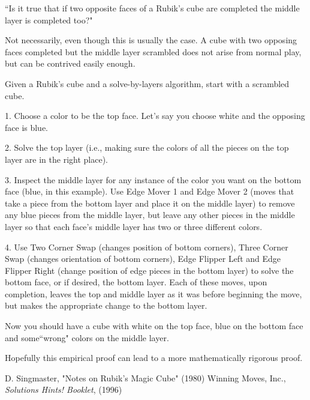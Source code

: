 \documentclass[12pt]{article}
\begin{document}
``Is it true that if two opposite faces of a Rubik's cube are completed the middle layer is completed too?"

Not necessarily, even though this is usually the case. A cube with two opposing faces completed but the middle layer scrambled does not arise from normal play, but can be contrived easily enough.

Given a Rubik's cube and a solve-by-layers algorithm, start with a scrambled cube.

1. Choose a color to be the top face. Let's say you choose white and the opposing face is blue.

2. Solve the top layer (i.e., making sure the colors of all the pieces on the top layer are in the right place).

3. Inspect the middle layer for any instance of the color you want on the bottom face (blue, in this example). Use Edge Mover 1 and Edge Mover 2 (moves that take a piece from the bottom layer and place it on the middle layer) to remove any blue pieces from the middle layer, but leave any other pieces in the middle layer so that each face's middle layer has two or three different colors.

4. Use Two Corner Swap (changes position of bottom corners), Three Corner Swap (changes orientation of bottom corners), Edge Flipper Left and Edge Flipper Right (change position of edge pieces in the bottom layer) to solve the bottom face, or if desired, the bottom layer. Each of these moves, upon completion, leaves the top and middle layer as it was before beginning the move, but makes the appropriate change to the bottom layer.

Now you should have a cube with white on the top face, blue on the bottom face and some``wrong" colors on the middle layer.

Hopefully this empirical proof can lead to a more mathematically rigorous proof.

\begin{thebibliography}{2}
 D. Singmaster, "Notes on Rubik's Magic Cube" (1980)
 Winning Moves, Inc., {\it Solutions Hints! Booklet}, (1996)
\end{thebibliography}
\end{document}
